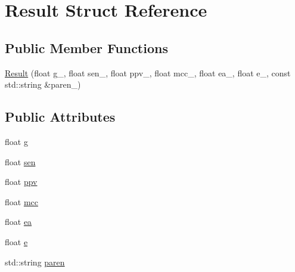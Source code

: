 \hypertarget{struct_result}{\section{Result Struct Reference}
\label{struct_result}
}
\subsection*{Public Member Functions}
\begin{DoxyCompactItemize}
\item 
\hyperlink{struct_result_aa445ec67b541cf68abebe5e2690cd4ce}{Result} (float g\+\_\+, float sen\+\_\+, float ppv\+\_\+, float mcc\+\_\+, float ea\+\_\+, float e\+\_\+, const std\+::string \&paren\+\_\+)
\end{DoxyCompactItemize}
\subsection*{Public Attributes}
\begin{DoxyCompactItemize}
\item 
float \hyperlink{struct_result_abc9ebc61c9bf5c894e28a41bbded49df}{g}
\item 
float \hyperlink{struct_result_a4e5d7f0713c789685bc004d2ba2ce13a}{sen}
\item 
float \hyperlink{struct_result_a7e3e0b23b5aa1d1238ecc84bb22c4730}{ppv}
\item 
float \hyperlink{struct_result_ab1732680ae2f2470872d1271303928a7}{mcc}
\item 
float \hyperlink{struct_result_a852fe7c67bf3479031184db1aa0d77e9}{ea}
\item 
float \hyperlink{struct_result_af5c4fcf9c970bc4fa6aa012983f4f7a8}{e}
\item 
std\+::string \hyperlink{struct_result_aac6267b349ffcbfc9407fb349f3e8ee2}{paren}
\end{DoxyCompactItemize}


